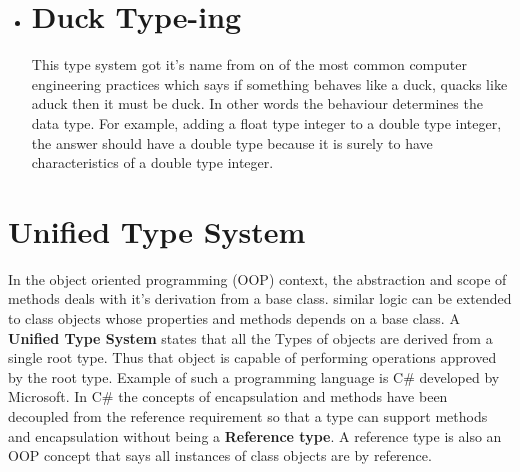 \begin{itemize}
\item{
\section*{Duck Type-ing}
This type system got it's name from on of the most common computer engineering practices which says if something behaves like a duck, quacks like aduck then it must be duck. In other words the behaviour determines the data type. For example, adding a float type integer to a double type integer, the answer should have a double type because it is surely to have characteristics of a double type integer.\\}

\end{itemize}

\section{Unified Type System}
In the object oriented programming (OOP) context, the abstraction and scope of methods deals with it's derivation from a base class. similar logic can be extended to class objects whose properties and methods depends on a base class. A \textbf{Unified Type System} states that all the Types of objects are derived from a single root type. Thus that object is capable of performing operations approved by the root type. Example of such a programming language is C\# developed by Microsoft.  In C\# the concepts of encapsulation and methods have been decoupled from the reference requirement so that a type can support methods and encapsulation without being a \textbf{Reference type}. A reference type is also an OOP concept that says all instances of class objects are by reference. \\

